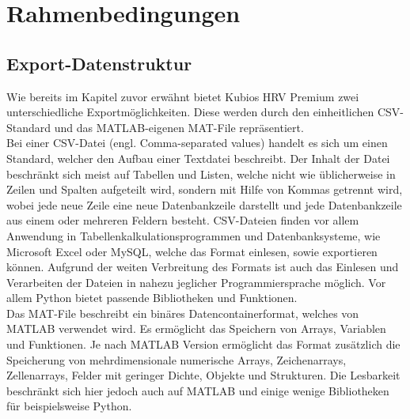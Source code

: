 
\chapter{Rahmenbedingungen}


\section{Export-Datenstruktur}

Wie bereits im Kapitel zuvor erwähnt bietet Kubios HRV Premium zwei unterschiedliche Exportmöglichkeiten. Diese werden durch den einheitlichen CSV-Standard und das MATLAB-eigenen MAT-File repräsentiert.\\
Bei einer CSV-Datei (engl. Comma-separated values) handelt es sich um einen Standard, welcher den Aufbau einer Textdatei beschreibt. Der Inhalt der Datei beschränkt sich meist auf Tabellen und Listen, welche nicht wie üblicherweise in Zeilen und Spalten aufgeteilt wird, sondern mit Hilfe von Kommas getrennt wird, wobei jede neue Zeile eine neue Datenbankzeile darstellt und jede Datenbankzeile aus einem oder mehreren Feldern besteht. CSV-Dateien finden vor allem Anwendung in Tabellenkalkulationsprogrammen und Datenbanksysteme, wie Microsoft Excel oder MySQL, welche das Format einlesen, sowie exportieren können. Aufgrund der weiten Verbreitung des Formats ist auch das Einlesen und Verarbeiten der Dateien in nahezu jeglicher Programmiersprache möglich. Vor allem Python bietet passende Bibliotheken und Funktionen.\\%
Das MAT-File beschreibt ein binäres Datencontainerformat, welches von MATLAB verwendet wird. Es ermöglicht das Speichern von Arrays, Variablen und Funktionen. Je nach MATLAB Version ermöglicht das Format zusätzlich die Speicherung von mehrdimensionale numerische Arrays, Zeichenarrays, Zellenarrays, Felder mit geringer Dichte, Objekte und Strukturen. Die Lesbarkeit beschränkt sich hier jedoch auch auf MATLAB und einige wenige Bibliotheken für beispielsweise Python.

